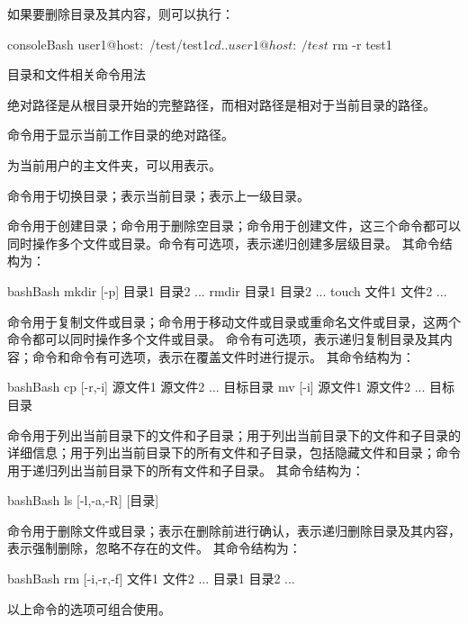 如果要删除目录及其内容，则可以执行：
\begin{envcode}{console}{Bash}
user1@host:~/test/test1$ cd ..
user1@host:~/test$ rm -r test1
\end{envcode}


\begin{zj}
目录和文件相关命令用法

绝对路径是从根目录开始的完整路径，而相对路径是相对于当前目录的路径。

命令用于显示当前工作目录的绝对路径。

为当前用户的主文件夹，可以用\code{~}表示。

命令用于切换目录；表示当前目录；表示上一级目录。

命令用于创建目录；命令用于删除空目录；命令用于创建文件，这三个命令都可以同时操作多个文件或目录。命令有可选项，表示递归创建多层级目录。
其命令结构为：
\begin{envcode}{bash}{Bash}
mkdir [-p] 目录1 目录2 ...
rmdir 目录1 目录2 ...
touch 文件1 文件2 ...
\end{envcode}

命令用于复制文件或目录；命令用于移动文件或目录或重命名文件或目录，这两个命令都可以同时操作多个文件或目录。
命令有可选项，表示递归复制目录及其内容；命令和命令有可选项，表示在覆盖文件时进行提示。
其命令结构为：
\begin{envcode}{bash}{Bash}
cp [-r,-i] 源文件1 源文件2 ... 目标目录
mv [-i] 源文件1 源文件2 ... 目标目录
\end{envcode}

命令用于列出当前目录下的文件和子目录；用于列出当前目录下的文件和子目录的详细信息；用于列出当前目录下的所有文件和子目录，包括隐藏文件和目录；命令用于递归列出当前目录下的所有文件和子目录。
其命令结构为：
\begin{envcode}{bash}{Bash}
ls [-l,-a,-R] [目录]
\end{envcode}

命令用于删除文件或目录；表示在删除前进行确认，表示递归删除目录及其内容，表示强制删除，忽略不存在的文件。
其命令结构为：
\begin{envcode}{bash}{Bash}
rm [-i,-r,-f] 文件1 文件2 ... 目录1 目录2 ...
\end{envcode}

以上命令的选项可组合使用。
\end{zj}

